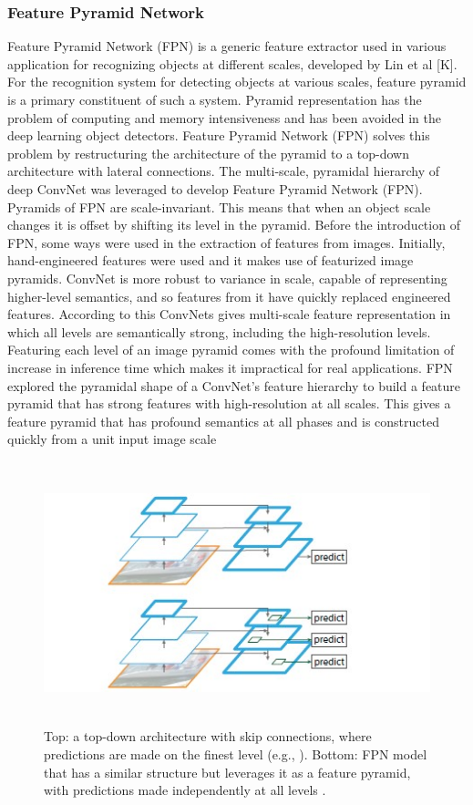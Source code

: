 {\subsubsection{Feature Pyramid Network}
Feature Pyramid Network (FPN) is a generic feature extractor used in various application for recognizing objects at different scales, developed by Lin et al [K]. For the recognition system for detecting objects at various scales, feature pyramid is a primary constituent of such a system. Pyramid representation has the problem of computing and memory intensiveness and has been avoided in the deep learning object detectors. 
Feature Pyramid Network (FPN) solves this problem by restructuring the architecture of the pyramid to a top-down architecture with lateral connections. The multi-scale, pyramidal hierarchy of deep ConvNet was leveraged to develop Feature Pyramid Network (FPN). Pyramids of  FPN are scale-invariant. This means that when an object scale changes it is offset by shifting its level in the pyramid.  
 Before the introduction of FPN, some ways were used in the extraction of features from images. Initially, hand-engineered features \cite{U} were used and it makes use of featurized image pyramids. ConvNet is more robust to variance in scale, capable of representing higher-level semantics, and so features from it have quickly replaced engineered features. 
 According to \cite{L} this ConvNets gives multi-scale feature representation in which all levels are semantically strong, including the high-resolution levels.  Featuring each level of an image pyramid comes with the profound limitation of increase in inference time which makes it impractical for real applications. FPN explored the pyramidal shape of a ConvNet’s feature hierarchy to build a feature pyramid that has strong features
  with high-resolution at all scales. 
 This gives a feature pyramid that has profound semantics at all phases and is constructed quickly  from a unit  input image scale 
\begin{figure}[H]
\centering
  \includegraphics[height=3in]{images/fpn.jpg}
   \caption{Top: a top-down architecture with skip connections, where predictions are made on the finest level (e.g., \protect\cite{T}). Bottom: FPN model that has a similar structure but leverages it as a feature pyramid, with predictions made independently at all levels \protect\cite{K}.}
\end{figure}

}
